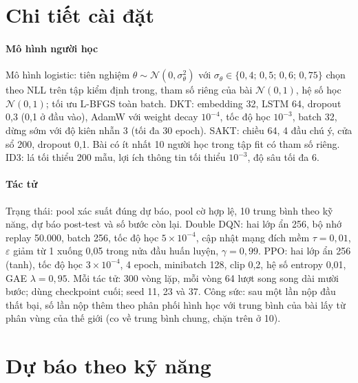 \documentclass[a4paper,preprint,12pt,authoryear]{elsarticle}
\begin{document}
\section{Chi tiết cài đặt}\label{app:impl}

\paragraph{Mô hình người học} Mô hình logistic: tiên nghiệm $\theta\sim\mathcal N(0,\sigma_\theta^2)$ với $\sigma_\theta\in\{0{,}4;\,0{,}5;\,0{,}6;\,0{,}75\}$ chọn theo NLL trên tập kiểm định trong, tham số riêng của bài $\mathcal N(0,1)$, hệ số học $\mathcal N(0,1)$; tối ưu L-BFGS toàn batch. DKT: embedding 32, LSTM 64, dropout 0,3 (0,1 ở đầu vào), AdamW với weight decay $10^{-4}$, tốc độ học $10^{-3}$, batch 32, dừng sớm với độ kiên nhẫn 3 (tối đa 30 epoch). SAKT: chiều 64, 4 đầu chú ý, cửa sổ 200, dropout 0,1. Bài có ít nhất 10 người học trong tập fit có tham số riêng. ID3: lá tối thiểu 200 mẫu, lợi ích thông tin tối thiểu $10^{-3}$, độ sâu tối đa 6.

\paragraph{Tác tử} Trạng thái: {{pool}} xác suất đúng dự báo, {{pool}} cờ hợp lệ, 10 trung bình theo kỹ năng, dự báo post-test và số bước còn lại. Double DQN: hai lớp ẩn 256, bộ nhớ replay 50.000, batch 256, tốc độ học $5\times10^{-4}$, cập nhật mạng đích mềm $\tau=0{,}01$, $\varepsilon$ giảm từ 1 xuống 0,05 trong nửa đầu huấn luyện, $\gamma=0{,}99$. PPO: hai lớp ẩn 256 (tanh), tốc độ học $3\times10^{-4}$, 4 epoch, minibatch 128, clip 0,2, hệ số entropy 0,01, GAE $\lambda=0{,}95$. Mỗi tác tử: 300 vòng lặp, mỗi vòng 64 lượt song song dài mười bước; dùng checkpoint cuối; seed 11, 23 và 37. Công sức: sau một lần nộp đầu thất bại, số lần nộp thêm theo phân phối hình học với trung bình của bài lấy từ phân vùng của thế giới (co về trung bình chung, chặn trên ở 10).

\section{Dự báo theo kỹ năng}\label{app:skills}

\begin{table}[H]
\centering
\caption{AUC theo kỹ năng chính của bài cần dự báo (người học kiểm tra T, mô hình fit trên A).}
\label{tab:skills}
\small
{}
\end{table}
\end{document}
